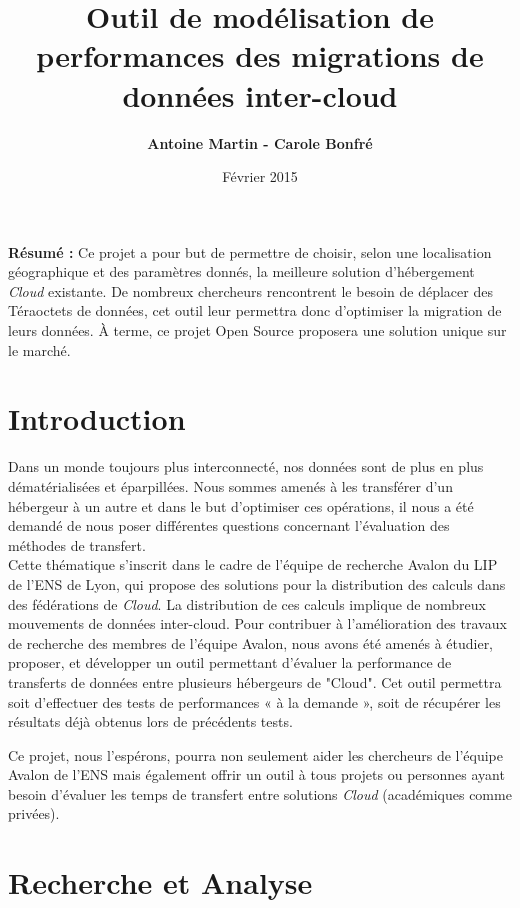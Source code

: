 \documentclass[10pt]{article}
\title{\Huge{Outil de modélisation de performances des migrations de données inter-cloud}}
\author{\textbf{Antoine Martin - Carole Bonfré} }
\date{Février 2015}
\begin{document}
\maketitle

\textbf{Résumé : } Ce projet a pour but de permettre de choisir, selon
une localisation géographique et des paramètres donnés, la meilleure
solution d'hébergement \textit{Cloud} existante. De nombreux chercheurs
rencontrent le besoin de déplacer des Téraoctets de données, cet outil
leur permettra donc d'optimiser la migration de leurs données. À
terme, ce projet Open Source proposera une solution unique sur le
marché.

\section{Introduction}

Dans un monde toujours plus interconnecté, nos données sont de plus en
plus dématérialisées et éparpillées. Nous sommes amenés à les
transférer d’un hébergeur à un autre et dans le but d’optimiser ces
opérations, il nous a été demandé de nous poser différentes questions
concernant l’évaluation des méthodes de transfert.\\
Cette thématique s’inscrit dans le cadre de l’équipe de recherche Avalon du LIP de
l’ENS de Lyon, qui propose des solutions pour la distribution des
calculs dans des fédérations de \textit{Cloud}. La distribution de ces calculs
implique de nombreux mouvements de données inter-cloud. Pour
contribuer à l’amélioration des travaux de recherche des membres de
l’équipe Avalon, nous avons été amenés à étudier, proposer, et développer un outil permettant d’évaluer
la performance de transferts de données entre plusieurs hébergeurs de
"Cloud". Cet outil permettra soit d’effectuer des tests de
performances « à la demande », soit de récupérer les résultats déjà
obtenus lors de précédents tests.\\


Ce projet, nous l’espérons, pourra non seulement aider les chercheurs
de l’équipe Avalon de l’ENS mais également offrir un outil à tous
projets ou personnes ayant besoin d’évaluer les temps de transfert
entre solutions \textit{Cloud} (académiques comme privées).

\section{Recherche et Analyse}
\end{document}
